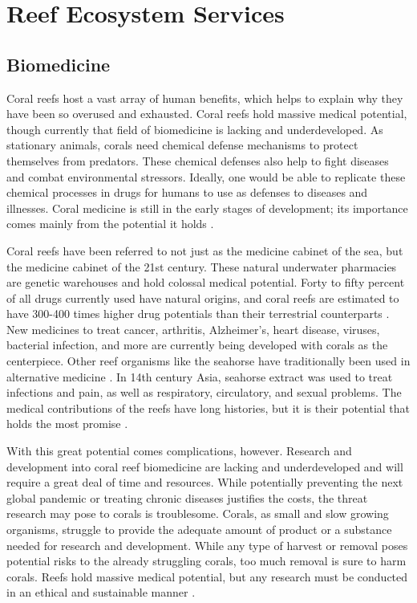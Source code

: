 \documentclass{book}\usepackage{knitr}
\begin{document}
\section{Reef Ecosystem Services}

\subsection{Biomedicine}

Coral reefs host a vast array of human benefits, which helps to explain why they have been so overused and exhausted. Coral reefs hold massive medical potential, though currently that field of biomedicine is lacking and underdeveloped. As stationary animals, corals need chemical defense mechanisms to protect themselves from predators. These chemical defenses also help to fight diseases and combat environmental stressors. Ideally, one would be able to replicate these chemical processes in drugs for humans to use as defenses to diseases and illnesses. Coral medicine is still in the early stages of development; its importance comes mainly from the potential it holds \citep{AndrewWBruckner_1970}.

Coral reefs have been referred to not just as the medicine cabinet of the sea, but the medicine cabinet of the 21st century. These natural underwater pharmacies are genetic warehouses and hold colossal medical potential. Forty to fifty percent of all drugs currently used have natural origins, and coral reefs are estimated to have 300-400 times higher drug potentials than their terrestrial counterparts \citep{AndrewWBruckner_1970}. New medicines to treat cancer, arthritis, Alzheimer’s, heart disease, viruses, bacterial infection, and more are currently being developed with corals as the centerpiece. Other reef organisms like the seahorse have traditionally been used in alternative medicine \citep{coralreefalliance_2021}. In 14th century Asia, seahorse extract was used to treat infections and pain, as well as respiratory, circulatory, and sexual problems. The medical contributions of the reefs have long histories, but it is their potential that holds the most promise \citep{AndrewWBruckner_1970}.

With this great potential comes complications, however. Research and development into coral reef biomedicine are lacking and underdeveloped and will require a great deal of time and resources. While potentially preventing the next global pandemic or treating chronic diseases justifies the costs, the threat research may pose to corals is troublesome. Corals, as small and slow growing organisms, struggle to provide the adequate amount of product or a substance needed for research and development. While any type of harvest or removal poses potential risks to the already struggling corals, too much removal is sure to harm corals. Reefs hold massive medical potential, but any research must be conducted in an ethical and sustainable manner \citep{AndrewWBruckner_1970}.
\end{document}
